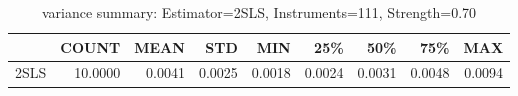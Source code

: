 \begin{table}[ht]
\centering
\caption{variance summary: Estimator=2SLS, Instruments=111, Strength=0.70}
\begin{tabular}{lrrrrrrrr}
\toprule
 & COUNT & MEAN & STD & MIN & 25\% & 50\% & 75\% & MAX \\
\midrule
2SLS & 10.0000 & 0.0041 & 0.0025 & 0.0018 & 0.0024 & 0.0031 & 0.0048 & 0.0094 \\
\bottomrule
\end{tabular}
\end{table}
